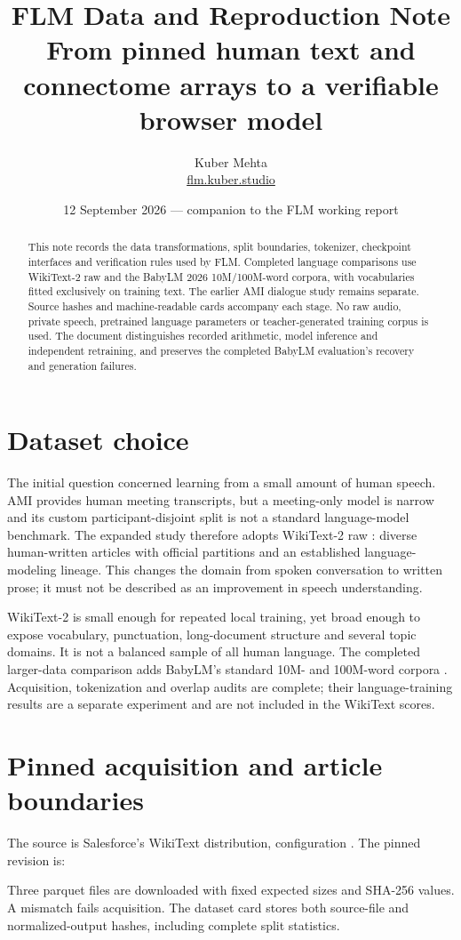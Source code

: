 \documentclass[10pt]{article}
\title{\textbf{FLM Data and Reproduction Note}\\[6pt]\large From pinned human text and connectome arrays to a verifiable browser model}
\author{Kuber Mehta\\\href{https://flm.kuber.studio}{flm.kuber.studio}}
\date{12 September 2026 --- companion to the FLM working report}
\begin{document}
\maketitle
\begin{abstract}
This note records the data transformations, split boundaries, tokenizer, checkpoint interfaces and verification rules used by FLM. Completed language comparisons use WikiText-2 raw and the BabyLM 2026 10M/100M-word corpora, with vocabularies fitted exclusively on training text. The earlier AMI dialogue study remains separate. Source hashes and machine-readable cards accompany each stage. No raw audio, private speech, pretrained language parameters or teacher-generated training corpus is used. The document distinguishes recorded arithmetic, model inference and independent retraining, and preserves the completed BabyLM evaluation's recovery and generation failures.
\end{abstract}

\section{Dataset choice}
The initial question concerned learning from a small amount of human speech. AMI provides human meeting transcripts, but a meeting-only model is narrow and its custom participant-disjoint split is not a standard language-model benchmark. The expanded study therefore adopts WikiText-2 raw \cite{wikitext,wikitextcard}: diverse human-written articles with official partitions and an established language-modeling lineage. This changes the domain from spoken conversation to written prose; it must not be described as an improvement in speech understanding.

WikiText-2 is small enough for repeated local training, yet broad enough to expose vocabulary, punctuation, long-document structure and several topic domains. It is not a balanced sample of all human language. The completed larger-data comparison adds BabyLM's standard 10M- and 100M-word corpora \cite{babylm}. Acquisition, tokenization and overlap audits are complete; their language-training results are a separate experiment and are not included in the WikiText scores.

\section{Pinned acquisition and article boundaries}
The source is Salesforce's WikiText distribution, configuration . The pinned revision is:
\begin{quote}\small{}\end{quote}
Three parquet files are downloaded with fixed expected sizes and SHA-256 values. A mismatch fails acquisition. The dataset card stores both source-file and normalized-output hashes, including complete split statistics.
\end{document}
